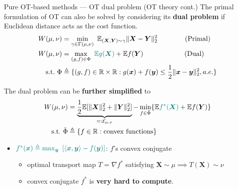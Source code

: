 \documentclass[10pt]{beamer}
\begin{document}
\begin{frame}{Pure OT-based methods --- \normalsize OT dual problem (OT theory cont.)}
    The primal formulation of OT can also be solved by considering its \textbf{dual problem} if Euclidean distance acts as the cost function.
    {\small
    \begin{align}
        W(\mu,\nu)  & = \min_{\gamma\in\Gamma(\mu,\nu)} \ \mathbb{E}_{(\bm{X},\bm{Y})\sim\gamma}\|\bm{X} - \bm{Y}\|_2^2 \quad\quad\quad\quad \text{(Primal)} \\
        W(\mu,\nu) & = \max_{(g,f)\in\Phi} \ {\color{teal}\mathbb{E}g(\bm{X})} + \mathbb{E}f(\bm{Y}) \quad\quad\quad\quad\quad\quad \text{(Dual)} \\
        \text{s.t.}\ \Phi & \triangleq\{{(g,f)\in\mathbb{R}\times\mathbb{R}:g(\bm{x}) + f(\bm{y})\leq\frac{1}{2}\|\bm{x}-\bm{y}\|_2^2,a.e.}\}\notag
    \end{align}}
    
    \bigskip
    
    The dual problem can be \textbf{further simplified}\cite{villani2003topics} to 
    {\small
    \begin{align}
        W(\mu,\nu) & = \underbrace{\frac{1}{2}\mathbb{E}[\|\bm{X}\|_2^2 + \|\bm{Y}\|_2^2]}_{=:\mathcal{E}_{\mu,\nu}} - 
        \min_{f\in\Tilde{\Phi}}\{\mathbb{E} {\color{teal}f^*(\bm{X})} + \mathbb{E} f(\bm{Y})\}\label{eq:dualot}\\
        \text{s.t.}\ \Tilde{\Phi} & \triangleq \{{f\in\mathbb{R}:\text{convex functions}}\}\notag
    \end{align}}
    \begin{itemize}
        \item ${\color{teal}f^*(\bm{x}) \triangleq \max_{\bm{y}}\ \left[\langle\bm{x},\bm{y}\rangle - f(\bm{y})\right]}$: $f$'s convex conjugate
        \begin{itemize}
            \item optimal transport map $T=\nabla f^*$ satisfying $\bm{X}\sim\mu\implies T(\bm{X})\sim\nu$
            \item convex conjugate $f^*$ is \textbf{very hard to compute}.
        \end{itemize}
    \end{itemize}
\end{frame}
\end{document}
